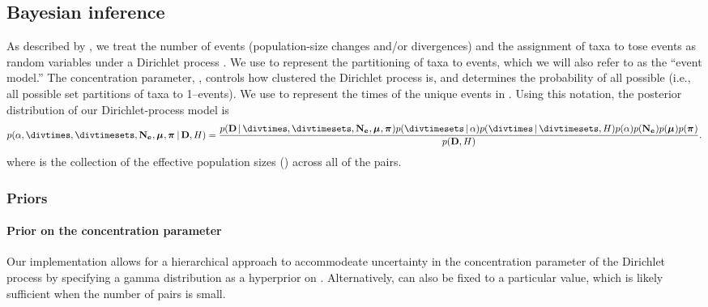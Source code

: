 \subsection{Bayesian inference}

\begin{linenomath}
As described by \citet{Oaks2018ecoevolity},
we treat the number of events (population-size changes and/or divergences)
and the assignment of taxa to tose events as
random variables under a Dirichlet process \citep{Ferguson1973,
    Antoniak1974}.
We use \etimesets to represent the partitioning of taxa to events,
which we will also refer to as the ``event model.''
The concentration parameter, \concentration, controls how clustered the
Dirichlet process is, and determines the probability of all possible \etimesets
(i.e., all possible set partitions of taxa to 1--\ncomparisons events).
We use \etimes to represent the times of the unique events in \etimesets.
Using this notation, the posterior distribution of our 
Dirichlet-process model is
\begin{equation}
    \pr(
    \concentration,
    \divtimes,
    \divtimesets,
    \collectionpopsizes,
    \murates,
    \gfreqs
    \given
    \alldata,
    \basedistribution
    )
    =
    \frac{
        \pr(
        \alldata
        \given
        \divtimes,
        \divtimesets,
        \collectionpopsizes,
        \murates,
        \gfreqs
        )
        \pr(\divtimesets \given \concentration)
        \pr(\divtimes \given \divtimesets, \basedistribution)
        \pr(\concentration)
        \pr(\collectionpopsizes)
        \pr(\murates)
        \pr(\gfreqs)
    }{
        \pr(
        \alldata,
        \basedistribution
        )
    }.
    \label{eq:bayesruleexpanded}
\end{equation}
where
\collectionpopsizes
is the collection of the effective population sizes (\comparisonpopsizes{})
across all of the pairs.

\subsubsection{Priors}

\paragraph{Prior on the concentration parameter}
Our implementation allows for a hierarchical approach to accommodeate
uncertainty in the concentration parameter of the Dirichlet process
by specifying a gamma distribution as a hyperprior on
\concentration \citep{Escobar1995,Heath2011}.
Alternatively, \concentration can also be fixed to a particular value,
which is likely sufficient when the number of pairs is small.


\end{linenomath}
